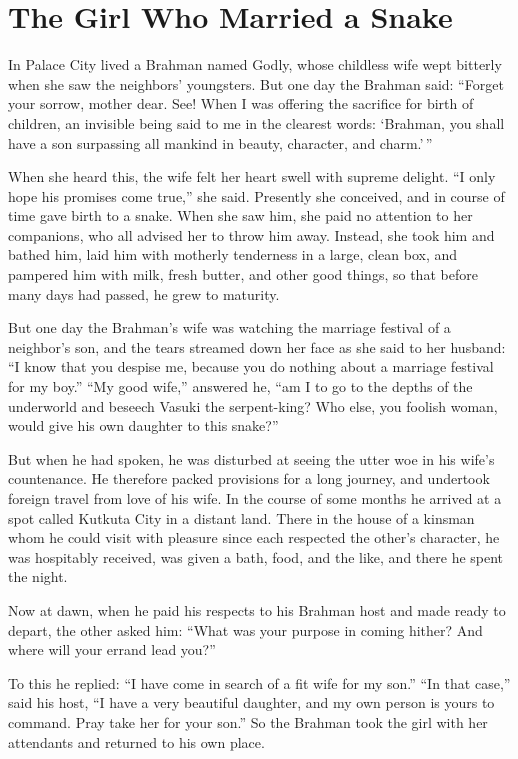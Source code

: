 \documentclass[article, twoside, 14pt]{memoir}
\begin{document}
\chapter{The Girl Who Married a Snake}

\label{s26}

In Palace City lived a Brahman named Godly, whose childless wife
wept bitterly when she saw the neighbors' youngsters. But one day
the Brahman said:
``Forget your sorrow, mother dear. See! When I was offering the sacrifice for birth of children, an invisible being said to me in the clearest words: `Brahman, you shall have a son surpassing all mankind in beauty, character, and charm.'\,''

When she heard this, the wife felt her heart swell with
supreme delight. ``I only hope his promises come true,'' she said.
Presently she conceived, and in course of time gave birth to a
snake. When she saw him, she paid no attention to her companions,
who all advised her to throw him away. Instead, she took him and
bathed him, laid him with motherly tenderness in a large, clean
box, and pampered him with milk, fresh butter, and other good
things, so that before many days had passed, he grew to maturity.

But one day the Brahman's wife was watching the marriage festival
of a neighbor's son, and the tears streamed down her face as she
said to her husband:
``I know that you despise me, because you do nothing about a marriage festival for my boy.''
``My good wife,'' answered he,
``am I to go to the depths of the underworld and beseech Vasuki the serpent-king? Who else, you foolish woman, would give his own daughter to this snake?''

But when he had spoken, he was disturbed at seeing the utter woe in
his wife's countenance. He therefore packed provisions for a long
journey, and undertook foreign travel from love of his wife. In the
course of some months he arrived at a spot called Kutkuta City in a
distant land. There in the house of a kinsman whom he could visit
with pleasure since each respected the other's character, he was
hospitably received, was given a bath, food, and the like, and
there he spent the night.

Now at dawn, when he paid his respects to his Brahman host and made
ready to depart, the other asked him:
``What was your purpose in coming hither? And where will your errand lead you?''

To this he replied:
``I have come in search of a fit wife for my son.''
``In that case,'' said his host,
``I have a very beautiful daughter, and my own person is yours to command. Pray take her for your son.''
So the Brahman took the girl with her attendants and returned to
his own place.
\end{document}

